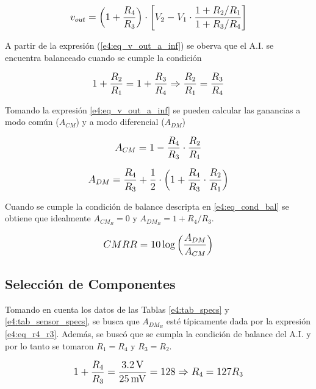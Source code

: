 \begin{equation}
\mathlarger{
v_{out} = \left(1 + \frac{R_4}{R_3}\right) \cdot \left[ V_2 - V_1 \cdot \frac{1+ R_2/R_1}{1+R_3/R_4} \right]
}
\label{e4:eq_v_out_a_inf}
\end{equation}

A partir de la expresión (\ref{e4:eq_v_out_a_inf}) se oberva que el A.I. se encuentra balanceado cuando se cumple la condición

\begin{equation}
\mathlarger{
1+\frac{R_2}{R_1} = 1+\frac{R_3}{R_4} \Rightarrow \frac{R_2}{R_1} = \frac{R_3}{R_4}
}
\label{e4:eq_cond_bal}
\end{equation}

Tomando la expresión \eqref{e4:eq_v_out_a_inf} se pueden calcular las ganancias a modo común ($A_{CM}$) y a modo diferencial ($A_{DM}$)

\begin{equation}
\mathlarger{
A_{CM} = 1 - \frac{R_4}{R_3} \cdot \frac{R_2}{R_1}
}
\label{e4:eq_A_cm}
\end{equation}

\begin{equation}
\mathlarger{
A_{DM} = \frac{R_4}{R_3} + \frac{1}{2} \cdot \left(1+ \frac{R_4}{R_3} \cdot \frac{R_2}{R_1}\right)
}
\label{e4:eq_A_dm}
\end{equation}

Cuando se cumple la condición de balance descripta en \eqref{e4:eq_cond_bal} se obtiene que idealmente $A_{CM_B} = 0$ y $A_{DM_B} = 1+R_4/R_3$.

\begin{equation}
\mathlarger{
CMRR=10\log\left(\frac{A_{DM}}{A_{CM}}\right)
}
\end{equation}

\subsection{Selección de Componentes}
Tomando en cuenta los datos de las Tablas \ref{e4:tab_specs} y \ref{e4:tab_sensor_specs}, se busca que $A_{DM_B}$ esté típicamente dada por la expresión \eqref{e4:eq_r4_r3}. Además, se buscó que se cumpla la condición de balance del A.I. y por lo tanto se tomaron $R_1=R_4$ y $R_3 = R_2$.

\begin{equation}
\mathlarger{
1+ \frac{R_4}{R_3}=\frac{\SI{3.2}{\volt}}{\SI{25}{\milli\volt}}= 128 \Rightarrow R_4=127 R_3
}
\label{e4:eq_r4_r3}
\end{equation}
 
